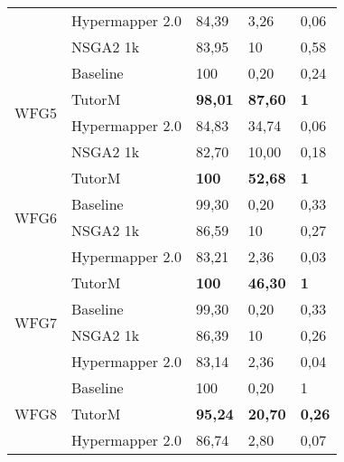\begin{table}[]
{\begin{tabular}{@{}lllll@{}}
                          & Hypermapper 2.0 & 84,39          & 3,26           & 0,06          \\ \cmidrule(l){2-5} 
                          & NSGA2 1k        & 83,95          & 10             & 0,58          \\ \midrule
    \multirow{4}{*}{WFG5} & Baseline       & 100            & 0,20           & 0,24          \\ \cmidrule(l){2-5} 
                          & TutorM          & \textbf{98,01} & \textbf{87,60} & \textbf{1}    \\ \cmidrule(l){2-5} 
                          & Hypermapper 2.0 & 84,83          & 34,74          & 0,06          \\ \cmidrule(l){2-5} 
                          & NSGA2 1k        & 82,70          & 10,00          & 0,18          \\ \midrule
    \multirow{4}{*}{WFG6} & TutorM          & \textbf{100}   & \textbf{52,68} & \textbf{1}    \\ \cmidrule(l){2-5} 
                          & Baseline       & 99,30          & 0,20           & 0,33          \\ \cmidrule(l){2-5} 
                          & NSGA2 1k        & 86,59          & 10             & 0,27          \\ \cmidrule(l){2-5} 
                          & Hypermapper 2.0 & 83,21          & 2,36           & 0,03          \\ \midrule
    \multirow{4}{*}{WFG7} & TutorM          & \textbf{100}   & \textbf{46,30} & \textbf{1}    \\ \cmidrule(l){2-5} 
                          & Baseline       & 99,30          & 0,20           & 0,33          \\ \cmidrule(l){2-5} 
                          & NSGA2 1k        & 86,39          & 10             & 0,26          \\ \cmidrule(l){2-5} 
                          & Hypermapper 2.0 & 83,14          & 2,36           & 0,04          \\ \midrule
    \multirow{4}{*}{WFG8} & Baseline       & 100            & 0,20           & 1             \\ \cmidrule(l){2-5} 
                          & TutorM          & \textbf{95,24} & \textbf{20,70} & \textbf{0,26} \\ \cmidrule(l){2-5} 
                          & Hypermapper 2.0 & 86,74          & 2,80           & 0,07          \\ \cmidrule(l){2-5} 

\end{tabular}}
\end{table}

